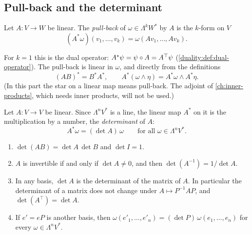 \begin{notechapter}
\section{Pull-back and the determinant}\label{multilinear-algebra:sec:det}

\begin{definition}\label{multilinear-algebra:def:pullback}
Let $A:V\to W$ be linear. The \emph{pull-back} of
$\omega\in\Lambda^kW^*$ by $A$ is the $k$-form on $V$
\[
  (A^*\omega)(v_1,\dots,v_k) = \omega(Av_1,\dots,Av_k) .
\]
\end{definition}

For $k = 1$ this is the dual operator: $A^*\psi = \psi\circ A
= A^{\top}\psi$ (\cref{duality:def:dual-operator}). The pull-back is
linear in $\omega$, and directly from the definitions
\[
  (AB)^* = B^*A^* , \qquad
  A^*(\omega\wedge\eta) = A^*\omega\wedge A^*\eta .
\]
(In this part the star on a linear map means pull-back. The adjoint of
\cref{ch:inner-products}, which needs inner products, will not be
used.)

\begin{definition}
\label{multilinear-algebra:def:det}
Let $A:V\to V$ be linear. Since $\Lambda^nV^*$ is a line, the linear map
$A^*$ on it is the multiplication by a number, the
\emph{determinant} of $A$:
\[
  A^*\omega = (\det A)\,\omega\qquad\text{for all }\omega\in\Lambda^nV^* .
\]
\end{definition}

\begin{theorem}\label{multilinear-algebra:thm:det}
\begin{enumerate}[nosep]
  \item $\det(AB) = \det A\,\det B$ and $\det I = 1$.
  \item $A$ is invertible if and only if $\det A\neq0$, and then
        $\det(A^{-1}) = 1/\det A$.
  \item In any basis, $\det A$ is the determinant of the matrix of $A$.
        In particular the determinant of a matrix does not change under
        $A\mapsto P^{-1}AP$, and
        $\det(A^\top) = \det A$.
  \item If $e' = eP$ is another basis, then
        $\omega(e'_1,\dots,e'_n) = (\det P)\,\omega(e_1,\dots,e_n)$ for
        every $\omega\in\Lambda^nV^*$.
\end{enumerate}
\end{theorem}


\end{notechapter}
